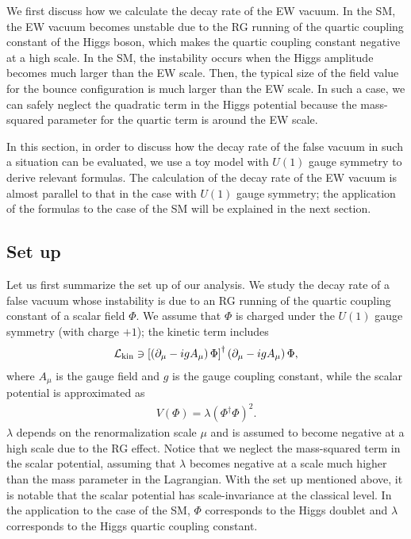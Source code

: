\documentclass[12pt]{article}
\begin{document}
We first discuss how we calculate the decay rate of the EW vacuum.  In
the SM, the EW vacuum becomes unstable due to the RG running of the
quartic coupling constant of the Higgs boson, which makes the quartic
coupling constant negative at a high scale.  In the SM, the
instability occurs when the Higgs amplitude becomes much larger than
the EW scale.  Then, the typical size of the field value for the
bounce configuration is much larger than the EW scale.  In such a
case, we can safely neglect the quadratic term in the Higgs potential
because the mass-squared parameter for the quartic term is around the
EW scale.

In this section, in order to discuss how the decay rate of the false
vacuum in such a situation can be evaluated, we use a toy model with
$U(1)$ gauge symmetry to derive relevant formulas.  The calculation of
the decay rate of the EW vacuum is almost parallel to that in the case
with $U(1)$ gauge symmetry; the application of the formulas to the
case of the SM will be explained in the next section.

\subsection{Set up}


Let us first summarize the set up of our analysis.  We study the decay
rate of a false vacuum whose instability is due to an RG running of
the quartic coupling constant of a scalar field $\Phi$.  We assume that
$\Phi$ is charged under the $U(1)$ gauge symmetry (with charge $+1$);
the kinetic term includes 
\begin{align}
  {\cal L}_{\rm kin} \ni
  \left[
    \left(
      \partial_\mu - i g A_\mu 
    \right) \Phi
  \right]^\dagger
  \left(
    \partial_\mu - i g A_\mu 
  \right) \Phi,
\end{align}
where $A_\mu$ is the gauge field and $g$ is the gauge coupling
constant, while the scalar potential is approximated as
\begin{align}
  V(\Phi) = \lambda(\Phi^\dagger\Phi)^2.
  \label{V(Phi)}
\end{align}
$\lambda$ depends on the renormalization scale $\mu$ and is assumed to
become negative at a high scale due to the RG effect.  Notice that we
neglect the mass-squared term in the scalar potential, assuming that
$\lambda$ becomes negative at a scale much higher than the mass
parameter in the Lagrangian.  With the set up mentioned above, it is
notable that the scalar potential has scale-invariance at the classical
level.  In the application to the case of the SM, $\Phi$ corresponds to
the Higgs doublet and $\lambda$ corresponds to the Higgs quartic
coupling constant.
\end{document}
